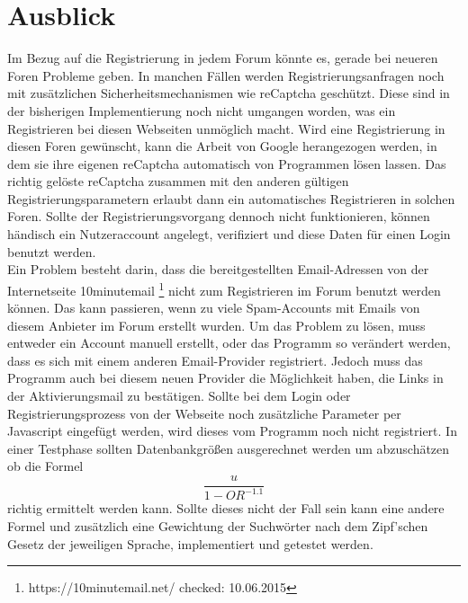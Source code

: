 \section{Ausblick}
Im Bezug auf die Registrierung in jedem Forum könnte es, gerade bei neueren Foren Probleme geben. In manchen Fällen werden Registrierungsanfragen noch mit zusätzlichen Sicherheitsmechanismen wie reCaptcha geschützt. Diese sind in der bisherigen Implementierung noch nicht umgangen worden, was ein Registrieren bei diesen Webseiten unmöglich macht. Wird eine Registrierung in diesen Foren gewünscht, kann die Arbeit von Google herangezogen werden, in dem sie ihre eigenen reCaptcha automatisch von Programmen lösen lassen. Das richtig gelöste reCaptcha zusammen mit den anderen gültigen Registrierungsparametern erlaubt dann ein automatisches Registrieren in solchen Foren. Sollte der Registrierungsvorgang dennoch nicht funktionieren, können händisch ein Nutzeraccount angelegt, verifiziert und diese Daten für einen Login benutzt werden.\\
Ein Problem besteht darin, dass die bereitgestellten Email-Adressen von der Internetseite 10minutemail \footnote{https://10minutemail.net/ checked: 10.06.2015} nicht zum Registrieren im Forum benutzt werden können. Das kann passieren, wenn zu viele Spam-Accounts mit Emails von diesem Anbieter im Forum erstellt wurden. Um das Problem zu lösen, muss entweder ein Account manuell erstellt, oder das Programm so verändert werden, dass es sich mit einem anderen Email-Provider registriert. Jedoch muss das Programm auch bei diesem neuen Provider die Möglichkeit haben, die Links in der Aktivierungsmail zu bestätigen.
Sollte bei dem Login oder Registrierungsprozess von der Webseite noch zusätzliche Parameter per Javascript eingefügt werden, wird dieses vom Programm noch nicht registriert.
In einer Testphase sollten Datenbankgrößen ausgerechnet werden um abzuschätzen ob die Formel  \[\frac{u}{1-OR^{-1.1}}\] \cite{lu2008efficient} richtig ermittelt werden kann. Sollte dieses nicht der Fall sein kann eine andere Formel und zusätzlich eine Gewichtung der Suchwörter nach dem Zipf'schen Gesetz \cite{leopold2002zipfsche} der jeweiligen Sprache, implementiert und getestet werden\cite{jiang2009selectivity}.
